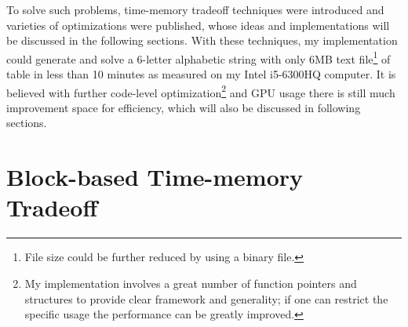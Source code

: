 \documentclass{article}
\begin{document}
\begin{multicols}{2}
To solve such problems, time-memory tradeoff techniques were introduced and varieties of optimizations were published, whose ideas and implementations will be discussed in the following sections. With these techniques, my implementation could generate and solve a 6-letter alphabetic string with only 6MB text file\footnote{File size could be further reduced by using a binary file.} of table in less than 10 minutes as measured on my Intel i5-6300HQ computer. It is believed with further code-level optimization\footnote{My implementation involves a great number of function pointers and structures to provide clear framework and generality; if one can restrict the specific usage the performance can be greatly improved.} and GPU usage there is still much improvement space for efficiency, which will also be discussed in following sections.

\section{Block-based Time-memory Tradeoff}




\end{multicols}
\end{document}
